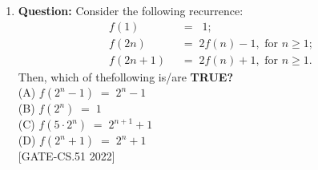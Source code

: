 \begin{enumerate}[label=\thechapter.\arabic*,ref=\thechapter.\theenumi]
\newpage
\item
\textbf{Question:}
Consider the following recurrence:
\begin{align}
	f(1)\;\;&=\;\;1;\label{g2-1cs.51}\\
	 f(2n)\;\;&=\;2f(n)-1,\text{  for $n\geq$1;}\label{g2-2cs.51}\\
	 f(2n+1)\;\;&=\;2f(n)+1,\text{  for $n\geq$1.}\label{g2-3cs.51}
\end{align}
Then, which of thefollowing is/are \textbf{TRUE?}\\
(A) $f(2^n-1)\;=\;2^n-1$\\
(B) $f(2^n)\;=\;1$\\
(C) $f(5\cdot2^n)\;=\;2^{n+1}+1$\\
(D) $f(2^n+1)\;=\;2^n+1$\\
\hfill{[GATE-CS.51 2022]}\\
\solution

\end{enumerate}

